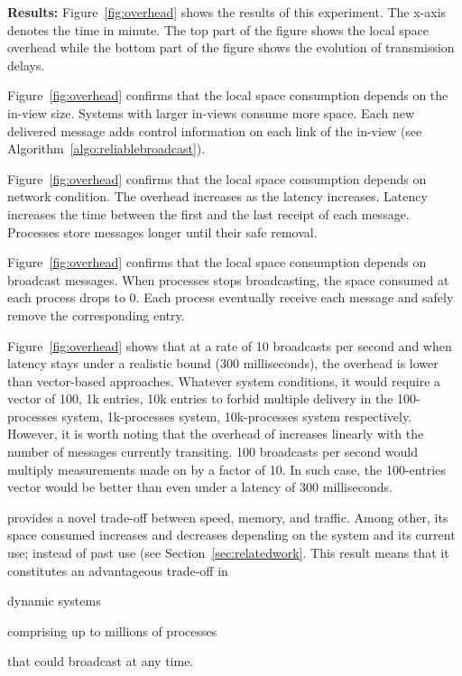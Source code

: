 \noindent \textbf{Results:} Figure~\ref{fig:overhead} shows the results of this
experiment. The x-axis denotes the time in minute. The top part of the figure
shows the local space overhead while the bottom part of the figure shows the
evolution of transmission delays.

\noindent Figure~\ref{fig:overhead} confirms that the local space consumption
depends on the in-view size. Systems with larger in-views consume more
space. Each new delivered message adds control information on each link of the
in-view (see Algorithm~\ref{algo:reliablebroadcast}).

\noindent Figure~\ref{fig:overhead} confirms that the local space consumption
depends on network condition. The overhead increases as the latency
increases. Latency increases the time between the first and the last receipt of
each message. Processes store messages longer until their safe removal.

\noindent Figure~\ref{fig:overhead} confirms that the local space consumption
depends on broadcast messages. When processes stops broadcasting, the space
consumed at each process drops to 0. Each process eventually receive each
message and safely remove the corresponding entry.

\noindent Figure~\ref{fig:overhead} shows that at a rate of 10 broadcasts per
second and when latency stays under a realistic bound ($300$ milliseconds), the
overhead is lower than vector-based approaches. Whatever system conditions, it
would require a vector of 100, 1k entries, 10k entries to forbid multiple
delivery in the 100-processes system, 1k-processes system, 10k-processes system
respectively. However, it is worth noting that the overhead of \RPCBROADCAST
increases linearly with the number of messages currently transiting. 100
broadcasts per second would multiply measurements made on \RPCBROADCAST by a
factor of 10. In such case, the 100-entries vector would be better than
\RPCBROADCAST even under a latency of $300$ milliseconds.

\noindent \RPCBROADCAST provides a novel trade-off between speed, memory, and
traffic. Among other, its space consumed increases and decreases depending on
the system and its current use; instead of past use (see
Section~\ref{sec:relatedwork}. This result means that it constitutes an
advantageous trade-off in
\begin{inparaenum}[(i)]
\item dynamic systems
\item comprising up to millions of processes
\item that could broadcast at any time.
\end{inparaenum} \\

